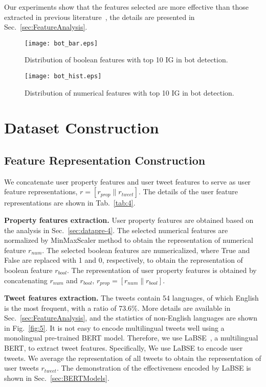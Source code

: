 \documentclass[10pt,twocolumn,letterpaper]{article}
\begin{document}
Our experiments show that the features selected are more effective than those extracted in previous literature~\cite{Alpher06,Alpher39,Alpher50}, the details are presented in Sec.~\ref{sec:FeatureAnalysis}.

\begin{figure*}[t]
  \centering
   \texttt{[image: bot\_bar.eps]}
   \vspace{-0.1cm}
   \caption{Distribution of boolean features with top 10 IG in bot detection.}
   \label{fig:3}
\end{figure*}

\begin{figure*}[t]
  \centering
   \texttt{[image: bot\_hist.eps]}
   \vspace{-0.1cm}
   \caption{Distribution of numerical features with top 10 IG in bot detection.}
   \label{fig:4}
\end{figure*}

\section{Dataset Construction}
\subsection{Feature Representation Construction}
\noindent
We concatenate user property features and user tweet features to serve as user feature representations, $r=\left[r_{prop} \| r_{tweet}\right]$. The details of the user feature representations are shown in Tab.~\ref{tab:4}.

\noindent
\textbf{Property features extraction.}
User property features are obtained based on the analysis in Sec.~\ref{sec:datapre-4}. The selected numerical features are normalized by MinMaxScaler method to obtain the representation of numerical feature $r_{num}$. The selected boolean features are numericalized, where True and False are replaced with 1 and 0, respectively, to obtain the representation of boolean feature $r_{bool}$. The representation of user property features is obtained by concatenating $r_{num}$ and $r_{bool}$, $r_{prop}=\left[r_{num} \| r_{bool}\right]$.

\noindent
\textbf{Tweet features extraction.}
The tweets contain 54 languages, of which English is the most frequent, with a ratio of 73.6\%. More details are available in Sec.~\ref{sec:FeatureAnalysis}, and the statistics of non-English languages are shown in Fig.~\ref{fig:5}. It is not easy to encode multilingual tweets well using a monolingual pre-trained BERT model. Therefore, we use LaBSE~\cite{Alpher54}, a multilingual BERT, to extract tweet features. Specifically, We use LaBSE to encode user tweets. We average the representation of all tweets to obtain the representation of user tweets $r_{tweet}$.
The demonstration of the effectiveness encoded by LaBSE is shown in Sec.~\ref{sec:BERTModels}.
\end{document}
